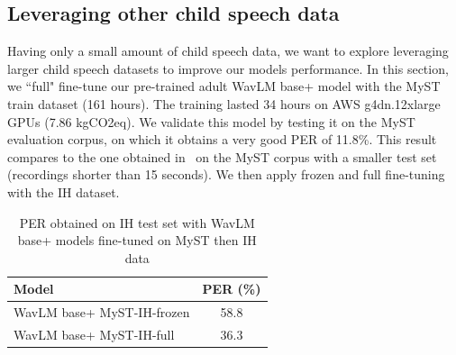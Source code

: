 \documentclass{Interspeech2024}
\begin{document}

\subsection{Leveraging other child speech data}
Having only a small amount of child speech data, we want to explore leveraging larger child speech datasets to improve our models performance. In this section, we ``full" fine-tune our pre-trained adult WavLM base+ model with the MyST train dataset (161 hours). The training lasted 34 hours on AWS g4dn.12xlarge GPUs (7.86 kgCO2eq). We validate this model by testing it on the MyST evaluation corpus, on which it obtains a very good PER of 11.8\%. This result compares to the one obtained in~\cite{Li2024-ASSL} on the MyST corpus with a smaller test set (recordings shorter than 15 seconds). We then apply frozen and full fine-tuning with the IH dataset.

\vspace{-0.2cm}
\begin{table}[!htb]
  \caption{PER obtained on IH test set with WavLM base+ models fine-tuned on MyST then IH data}
  \label{tab:myST-results}
  \centering
  \begin{tabular}{|l|c|}
    \hline
    \textbf{Model} & \textbf{PER (\%)} \\
    \hline
    WavLM base+ MyST-IH-frozen & 58.8 \\
    WavLM base+ MyST-IH-full & 36.3 \\    
    \hline
  \end{tabular}
\end{table}
\vspace{-0.2cm}
\end{document}
